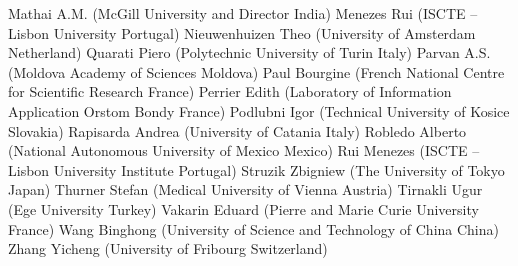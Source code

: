 \documentclass[oneside,A4paper,12pt]{article}
\begin{document}
\begin{flushleft}
 Mathai A.M. (McGill University and Director                          India)                       \newline
 Menezes Rui (ISCTE – Lisbon University                               Portugal)                    \newline
 Nieuwenhuizen Theo (University of Amsterdam                          Netherland)                  \newline
 Quarati Piero (Polytechnic University of Turin                       Italy)                       \newline
 Parvan A.S. (Moldova Academy of Sciences                             Moldova)                     \newline
 Paul Bourgine (French National Centre for Scientific Research        France)                      \newline
 Perrier Edith (Laboratory of Information Application                 Orstom        Bondy  France) \newline
 Podlubni Igor (Technical University of Kosice                        Slovakia)                    \newline
 Rapisarda Andrea (University of Catania                              Italy)                       \newline
 Robledo Alberto (National Autonomous University of Mexico            Mexico)                      \newline
 Rui Menezes (ISCTE – Lisbon University Institute                     Portugal)                    \newline
 Struzik Zbigniew (The University of Tokyo                            Japan)                       \newline
 Thurner Stefan (Medical University of Vienna                         Austria)                     \newline
 Tirnakli Ugur (Ege University                                        Turkey)                      \newline
 Vakarin Eduard (Pierre and Marie Curie University                    France)                      \newline
 Wang Binghong (University of Science and Technology of China         China)                       \newline
 Zhang Yicheng (University of Fribourg                                Switzerland)                 \newline

\end{flushleft}
\end{document}
